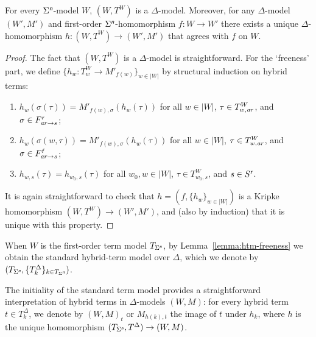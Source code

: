 \documentclass[a4paper,UKenglish,cleveref,autoref]{lipics-v2019}
\begin{document}
\begin{lemma} 
  \label{lemma:htm-freeness}
  For every\/ \(\Sigma^{\text{\normalfont\sffamily\itshape n}}\)-model\/ \(W\), \((W, T^{W})\) is a \(\Delta\)-model.
  Moreover, for any \(\Delta\)-model \((W', M')\) and first-order\/ \(\Sigma^{\text{\normalfont\sffamily\itshape n}}\)-homomorphism \(f \colon W \to W'\) there exists a unique \(\Delta\)-homomorphism \(h \colon (W, T^{W}) \to (W', M')\) that agrees with \(f\) on \(W\).
\end{lemma}
\begin{proof}
  The fact that \((W, T^{W})\) is a \(\Delta\)-model is straightforward.
  For the `freeness' part, we define \(\{ h_{w} \colon T^{W}_{w} \to M'_{f(w)} \}_{w \in |W|}\) by structural induction on hybrid terms:
  \begin{enumerate}
  \item \(h_{w}(\sigma(\tau)) = M'_{f(w),\sigma}(h_{w}(\tau))\) for all \(w \in |W|\), \(\tau \in T^{W}_{w,\mathit{a\mkern -1mu r}}\), and \(\sigma \in F^{\text{\normalfont\sffamily\itshape r}}_{\mathit{a\mkern -1mu r} \to s}\);

  \item \(h_{w}(\sigma(w, \tau)) = M'_{f(w),\sigma}(h_{w}(\tau))\) for all \(w \in |W|\), \(\tau \in T^{W}_{w,\mathit{a\mkern -1mu r}}\), and \(\sigma \in F^{\text{\normalfont\sffamily\itshape f}}_{\mathit{a\mkern -1mu r} \to s}\);

  \item \(h_{w, s}(\tau) = h_{w_{0}, s}(\tau)\) for all \(w_{0}, w \in |W|\), \(\tau \in T^{W}_{w_{0}, s}\), and \(s \in S^{\text{\normalfont\sffamily\itshape r}}\).

  \end{enumerate}
  It is again straightforward to check that \(h = (f, \{ h_{w} \}_{w \in |W|})\) is a Kripke homomorphism \((W, T^{W}) \to (W', M')\), and (also by induction) that it is unique with this property.
\end{proof}

When \(W\) is the first-order term model \(T_{\Sigma^{\text{\normalfont\sffamily\itshape n}}}\), by Lemma~\ref{lemma:htm-freeness} we obtain the standard hybrid-term model over \(\Delta\), which we denote by \((T_{\Sigma^{\text{\normalfont\sffamily\itshape n}}}, \{T^{\Delta}_{k}\}_{k \in T_{\Sigma^{\text{\normalfont\sffamily\itshape n}}}})\).

The initiality of the standard term model provides a straightforward interpretation of hybrid terms in \(\Delta\)-models \((W, M)\): for every hybrid term \(t \in T^{\Delta}_{k}\), we denote by \((W, M)_{t}\) or \(M_{h(k), t}\) the image of \(t\) under \(h_{k}\), where \(h\) is the unique homomorphism \((T_{\Sigma^{\text{\normalfont\sffamily\itshape n}}}, T^{\Delta}) \to (W, M)\).
\end{document}
